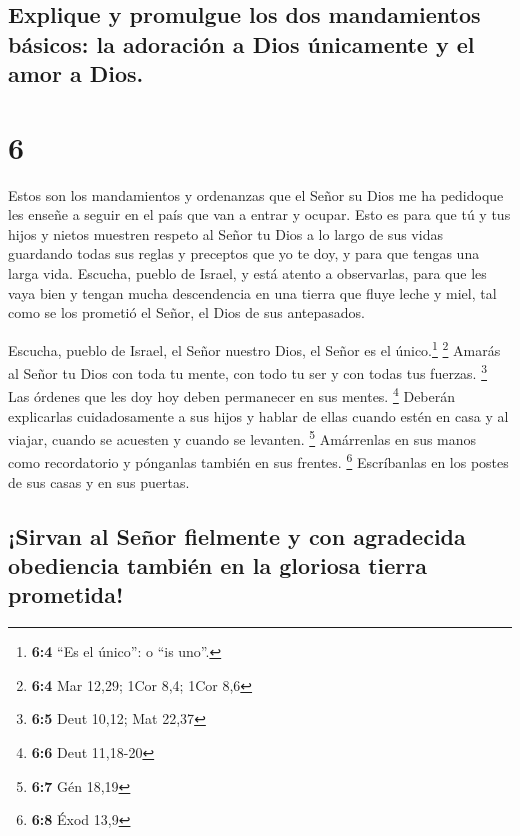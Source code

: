 \hypertarget{explique-y-promulgue-los-dos-mandamientos-buxe1sicos-la-adoraciuxf3n-a-dios-uxfanicamente-y-el-amor-a-dios.}{%
\subsection{Explique y promulgue los dos mandamientos básicos: la
adoración a Dios únicamente y el amor a
Dios.}\label{explique-y-promulgue-los-dos-mandamientos-buxe1sicos-la-adoraciuxf3n-a-dios-uxfanicamente-y-el-amor-a-dios.}}

\hypertarget{section-5}{%
\section{6}\label{section-5}}

 Estos son los mandamientos y ordenanzas que el Señor su
Dios me ha pedidoque les enseñe a seguir en el país que van a entrar y
ocupar.  Esto es para que tú y tus hijos y nietos muestren
respeto al Señor tu Dios a lo largo de sus vidas guardando todas sus
reglas y preceptos que yo te doy, y para que tengas una larga vida.
 Escucha, pueblo de Israel, y está atento a observarlas,
para que les vaya bien y tengan mucha descendencia en una tierra que
fluye leche y miel, tal como se los prometió el Señor, el Dios de sus
antepasados.

 Escucha, pueblo de Israel, el Señor nuestro Dios, el
Señor es el único.\footnote{\textbf{6:4} ``Es el único'': o ``is uno''.}
\footnote{\textbf{6:4} Mar 12,29; 1Cor 8,4; 1Cor 8,6} 
Amarás al Señor tu Dios con toda tu mente, con todo tu ser y con todas
tus fuerzas. \footnote{\textbf{6:5} Deut 10,12; Mat 22,37}
 Las órdenes que les doy hoy deben permanecer en sus
mentes. \footnote{\textbf{6:6} Deut 11,18-20}  Deberán
explicarlas cuidadosamente a sus hijos y hablar de ellas cuando estén en
casa y al viajar, cuando se acuesten y cuando se levanten. \footnote{\textbf{6:7}
  Gén 18,19}  Amárrenlas en sus manos como recordatorio y
pónganlas también en sus frentes. \footnote{\textbf{6:8} Éxod 13,9}
 Escríbanlas en los postes de sus casas y en sus puertas.

\hypertarget{sirvan-al-seuxf1or-fielmente-y-con-agradecida-obediencia-tambiuxe9n-en-la-gloriosa-tierra-prometida}{%
\subsection{¡Sirvan al Señor fielmente y con agradecida obediencia
también en la gloriosa tierra
prometida!}\label{sirvan-al-seuxf1or-fielmente-y-con-agradecida-obediencia-tambiuxe9n-en-la-gloriosa-tierra-prometida}}

